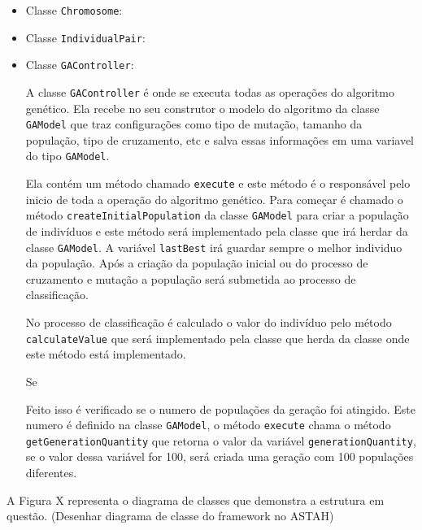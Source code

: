 \begin{itemize}
	\item Classe \texttt{Chromosome}:
	\par 
	
	\item Classe \texttt{IndividualPair}:
	\par
	
	
	\item Classe \texttt{GAController}:
	\par A classe \texttt{GAController} é onde se executa todas as operações do
	algoritmo genético. Ela recebe no seu construtor o modelo do algoritmo da
	classe \texttt{GAModel} que traz configurações como tipo de mutação, tamanho da
	população, tipo de cruzamento, etc e salva essas informações em uma variavel
	do tipo \texttt{GAModel}.
	
	\par Ela contém um método chamado \texttt{execute} e este método é o
	responsável pelo inicio de toda a operação do algoritmo genético. 
	Para começar é chamado o método  \texttt{createInitialPopulation} da classe
	\texttt{GAModel} para criar a população de indivíduos e este método será implementado pela
	classe que irá herdar da classe \texttt{GAModel}.
	A variável \texttt{lastBest} irá guardar sempre o melhor individuo da
	população. Após a criação da população inicial ou do processo de cruzamento e
	mutação a população será submetida ao processo de classificação.
	
	\par No processo de classificação é calculado o valor do indivíduo pelo método
	\texttt{calculateValue} que será implementado pela classe que herda da classe
	onde este método está implementado.
	
	\par Se 
		
	\par Feito isso é verificado se o numero de populações da geração foi
	atingido. Este numero é definido na classe \texttt{GAModel}, o método
	\texttt{execute} chama o método \texttt{getGenerationQuantity} que retorna o
	valor da variável \texttt{generationQuantity}, se o valor dessa variável for 100, 
	será criada uma geração com 100 populações diferentes.
	
	
	
	
\end{itemize}

A Figura X representa o diagrama de classes que demonstra a estrutura em questão.
(Desenhar diagrama de classe do framework no ASTAH)


